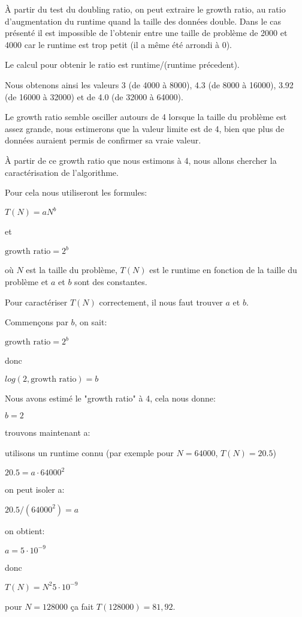 \documentclass[a4paper,10pt]{article}
\begin{document}
À partir du test du doubling ratio, on peut extraire le \og{}growth ratio\fg{}, au ratio d'augmentation du runtime quand la taille des données double. Dans le cas présenté il est impossible de l'obtenir entre une taille de problème de 2000 et 4000 car le runtime est trop petit (il a même été arrondi à 0).

Le calcul pour obtenir le ratio est runtime/(runtime précedent).

Nous obtenons ainsi les valeurs 3 (de 4000 à 8000), 4.3 (de 8000 à 16000), 3.92 (de 16000 à 32000) et de 4.0 (de 32000 à 64000).

Le \og{}growth ratio\fg{} semble osciller autours de 4 lorsque la taille du problème est assez grande, nous estimerons que la valeur limite est de 4, bien que plus de données auraient permis de confirmer sa vraie valeur.

À partir de ce \og{}growth ratio\fg{} que nous estimons à 4, nous allons chercher la caractérisation de l'algorithme.

Pour cela nous utiliseront les formules:

$T(N) = a N^b$

et

$\text{growth ratio} = 2^b$

où $N$ est la taille du problème, $T(N)$ est le runtime en fonction de la taille du problème et $a$ et $b$ sont des constantes.

Pour caractériser $T(N)$ correctement, il nous faut trouver $a$ et $b$.

Commençons par $b$, on sait:

$\text{growth ratio} = 2^b$

donc

$log(2, \text{growth ratio}) = b$

Nous avons estimé le "growth ratio" à 4, cela nous donne:

$b = 2$

trouvons maintenant a:

utilisons un runtime connu (par exemple pour $N = 64000$, $T(N) = 20.5$)

$20.5 = a \cdot 64000^2$

on peut isoler a:

$20.5/(64000^2) = a$

on obtient:

$a = 5 \cdot 10^{-9}$

donc

$T(N) = N^2 5 \cdot 10^{-9}$

pour $N = 128000$ ça fait $T(128000) = 81,92$.
\end{document}
